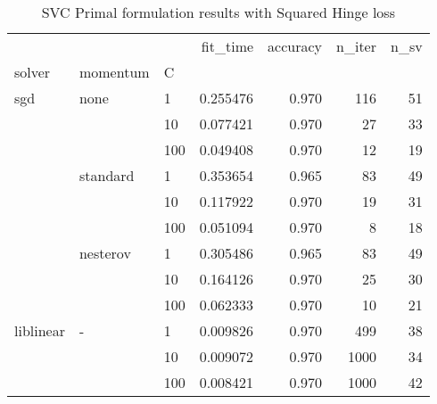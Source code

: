\begin{table}[H]
\centering
\caption{SVC Primal formulation results with Squared Hinge loss}
\label{primal_svc_squared_hinge_cv_results}
\begin{tabular}{lllrrrr}
\toprule
          &   &     &  fit\_time &  accuracy &  n\_iter &  n\_sv \\
solver & momentum & C &           &           &         &       \\
\midrule
sgd & none & 1   &  0.255476 &     0.970 &     116 &    51 \\
          &   & 10  &  0.077421 &     0.970 &      27 &    33 \\
          &   & 100 &  0.049408 &     0.970 &      12 &    19 \\
          & standard & 1   &  0.353654 &     0.965 &      83 &    49 \\
          &   & 10  &  0.117922 &     0.970 &      19 &    31 \\
          &   & 100 &  0.051094 &     0.970 &       8 &    18 \\
          & nesterov & 1   &  0.305486 &     0.965 &      83 &    49 \\
          &   & 10  &  0.164126 &     0.970 &      25 &    30 \\
          &   & 100 &  0.062333 &     0.970 &      10 &    21 \\
liblinear & - & 1   &  0.009826 &     0.970 &     499 &    38 \\
          &   & 10  &  0.009072 &     0.970 &    1000 &    34 \\
          &   & 100 &  0.008421 &     0.970 &    1000 &    42 \\
\bottomrule
\end{tabular}
\end{table}
